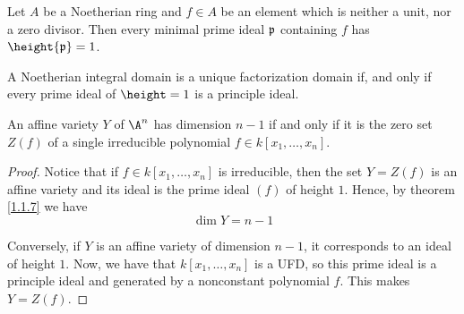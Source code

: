 \begin{theorem}\label{1.1.10}
    Let $A$ be a Noetherian ring and $f \in A$ be an element which is neither a
    unit, nor a zero divisor. Then every minimal prime ideal $\mathfrak{p}$ containing
    $f$ has $\height{\pf}=1$.
\end{theorem}

\begin{lemma}\label{1.1.11}
    A Noetherian integral domain is a unique factorization domain if, and only
    if every prime ideal of  $\height=1$ is a principle ideal.
\end{lemma}

\begin{lemma}\label{1.1.12}
    An affine variety $Y$ of  $\A^n$ has dimension $n-1$ if and only if it is
    the zero set $Z(f)$ of a single irreducible polynomial $f \in k[x_1, \dots,
    x_n]$.
\end{lemma}
\begin{proof}
    Notice that if $f \in k[x_1, \dots, x_n]$ is irreducible, then the set
    $Y=Z(f)$ is an affine variety and its ideal is the prime ideal $(f)$ of
    height $1$. Hence, by theorem \ref{1.1.7} we have
    \begin{equation*}
        \dim{Y}=n-1
    \end{equation*}

    Conversely, if $Y$ is an affine variety of dimension  $n-1$, it corresponds
    to an ideal of height $1$. Now, we have that $k[x_1, \dots, x_n]$ is a UFD,
    so this prime ideal is a principle ideal and generated by a nonconstant
    polynomial $f$. This makes  $Y=Z(f)$.
\end{proof}
